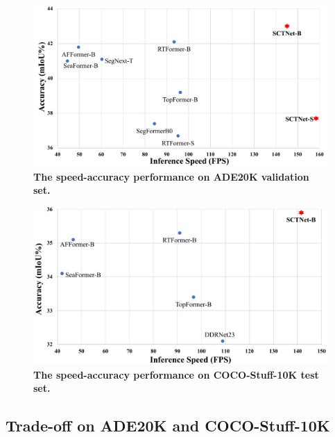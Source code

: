 \documentclass[letterpaper]{article} %
\begin{document}
\begin{figure}[tb]
\begin{center}
   \includegraphics[width=1.0\linewidth]{./image/supp/sup-ADE-trade-off.pdf}
\end{center}
   \caption{\textbf{The speed-accuracy performance on ADE20K validation set.} }
\label{suppfig:ADE_trade-off}
\vspace{-10pt}
\end{figure}

\begin{figure}[tb]
\begin{center}
   \includegraphics[width=1.0\linewidth]{./image/supp/sup-COCO-trade-off.pdf}
\end{center}
   \caption{\textbf{The speed-accuracy performance on COCO-Stuff-10K test set.} }
\label{suppfig:COCO_trade-off}
\end{figure}

\subsection{Trade-off on ADE20K and COCO-Stuff-10K}\label{app:sec:ade-coco-tradeoff}
\end{document}
